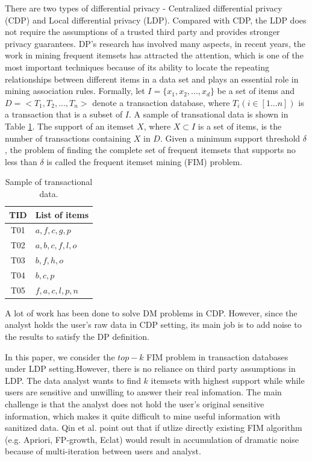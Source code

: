 \documentclass[conference]{IEEEtran}
\begin{document}
There are two types of differential privacy - Centralized differential privacy (CDP) and Local differential privacy (LDP). Compared with CDP, the LDP does not require the assumptions of a trusted third party and provides stronger privacy guarantees.  {\color{red}DP's research has involved many aspects, in recent years, the work in mining frequent itemsets has attracted the attention, which is one of  the most important techniques because of its ability to locate the repeating relationships between different items in a data set and plays an essential role in mining association rules\cite{apriori}. Formally, let $I = \{x_1,x_2,...,x_d\}$ be a set of items and $D = <T_1,T_2,...,T_n>$ denote a transaction database, where $T_i(i \in [1...n])$ is a transaction that is a subset of $I$. A sample of transational data is shown in Table \ref{trans table}. The support of an itemset $X$, where $X \subset I$ is a set of items, is the number of transactions containing $X$ in $D$. Given a minimum support threshold $\delta$, the problem of finding the complete set of frequent itemsets that supports no less than $\delta$ is called the frequent itemset mining (FIM) problem.}

\begin{table}[htbp]
\caption{{\color{red}Sample of transactional data.}}
\begin{center}
\begin{tabular}{|c|l|}\hline
  TID&List of items \\\hline
  T01&$a,f,c,g,p$ \\\hline
  T02&$a,b,c,f,l,o$ \\\hline
  T03&$b,f,h,o$ \\\hline
  T04&$b,c,p$ \\\hline
  T05&$f,a,c,l,p,n$ \\\hline
\end{tabular}
\label{trans table}
\end{center}
\end{table}

A lot of work\cite{a3,a4,a5,a6} has been done to solve DM problems in CDP. However, since the analyst holds the user's raw data in CDP setting, its main job is to add noise to the results to satisfy the DP definition.

In this paper, we consider the $top-k$ FIM problem in transaction databases under LDP setting.However, there is no reliance on third party assumptions in LDP. The data analyst wants to find $k$ itemsets with highest support while while users are sensitive and unwilling to answer their real infomation. The main challenge is that the analyst does not hold the user's original sensitive information, which makes it quite difficult to mine useful information with sanitized data. Qin et al.\cite{a1} point out that if utlize directly existing FIM algorithm (e.g. Apriori\cite{apriori,apr}, FP-growth\cite{fp}, Eclat\cite{eclat}) would result in accumulation of dramatic noise because of multi-iteration between users and analyst.
\end{document}
